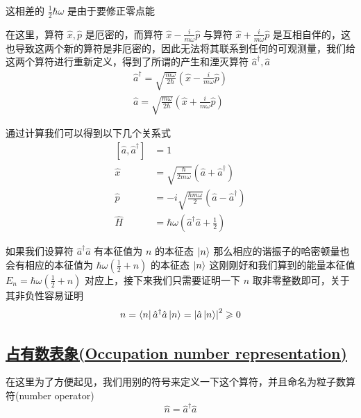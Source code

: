 这相差的 $\displaystyle \frac{1}{2}\hbar\omega $ 是由于要修正零点能

在这里，算符 $\hat{x},\hat{p}$ 是厄密的，而算符 $\displaystyle \hat{x} - \frac{i}{m\omega}\hat{p}$ 与算符 $\displaystyle \hat{x} + \frac{i}{m\omega}\hat{p}$ 是互相自伴的，这也导致这两个新的算符是非厄密的，因此无法将其联系到任何的可观测量，我们给这两个算符进行重新定义，得到了所谓的产生和湮灭算符 $\hat{a}^\dagger,\hat{a}$
\begin{align*}
    \hat{a}^\dagger = \sqrt{\frac{m\omega}{2\hbar}}\left(\hat{x} - \frac{i}{m\omega}\hat{p}\right) \\
    \hat{a} = \sqrt{\frac{m\omega}{2\hbar}}\left(\hat{x} + \frac{i}{m\omega}\hat{p}\right)
\end{align*}

通过计算我们可以得到以下几个关系式
\begin{align*}
    \left[\hat{a},\hat{a}^\dagger\right] &= 1 \\
    \hat{x} &= \sqrt{\frac{\hbar}{2m\omega}} \left(\hat{a} + \hat{a}^\dagger\right) \\
    \hat{p} &= -i\sqrt{\frac{\hbar m \omega}{2}} \left(\hat{a} - \hat{a}^\dagger\right) \\
    \hat{H} &= \hbar \omega \left(\hat{a}^\dagger \hat{a} + \frac{1}{2}\right)
\end{align*}


如果我们设算符 $\hat{a}^\dagger \hat{a}$ 有本征值为 $n$ 的本征态 $\ket{n}$ 那么相应的谐振子的哈密顿量也会有相应的本征值为 $\hbar \omega \left(\frac{1}{2} + n\right)$ 的本征态 $\ket{n}$ 这刚刚好和我们算到的能量本征值 $E_n = \hbar \omega \left(\frac{1}{2} + n\right)$ 对应上，接下来我们只需要证明一下 $n$ 取非零整数即可，关于其非负性容易证明
\begin{equation*}
    n = \bra{n}\hat{a}^\dagger\hat{a}\ket{n} = \left|\hat{a}\ket{n}\right|^2 \geqslant  0
\end{equation*}


\subsection{\protect\hyperlink{:}{占有数表象(Occupation number representation)}}

在这里为了方便起见，我们用别的符号来定义一下这个算符，并且命名为粒子数算符(number operator)
\begin{equation*}
    \hat{n} = \hat{a}^\dagger \hat{a}
\end{equation*}


